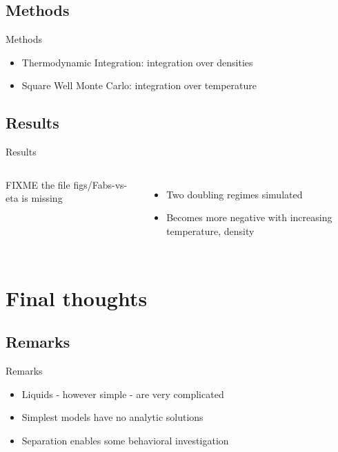 \documentclass{beamer}
\begin{document}
\subsection*{Methods}
\begin{frame}{Methods}
	\begin{itemize}
		\item Thermodynamic Integration: integration over densities
		\item Square Well Monte Carlo: integration over temperature
	\end{itemize}
\end{frame}

\subsection*{Results}
\begin{frame}{Results}
\begin{columns}
        FIXME the file figs/Fabs-vs-eta is missing
	\begin{itemize}
		\item Two doubling regimes simulated
		\item Becomes more negative with increasing temperature, density 
	\end{itemize}
\end{columns}
\end{frame}

\section*{Final thoughts}
\subsection*{Remarks}
\begin{frame}{Remarks}
	\begin{itemize}
		\item Liquids - however simple - are very complicated
		\item Simplest models have no analytic solutions
		\item Separation enables some behavioral investigation
	\end{itemize}
\end{frame}
\end{document}
